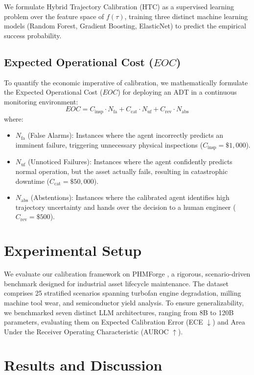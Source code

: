 \documentclass[10pt,twocolumn,a4paper]{article}
\begin{document}
We formulate Hybrid Trajectory Calibration (HTC) as a supervised learning problem over the feature space of $f(\tau)$, training three distinct machine learning models (Random Forest, Gradient Boosting, ElasticNet) to predict the empirical success probability.

\subsection{Expected Operational Cost ($EOC$)}
To quantify the economic imperative of calibration, we mathematically formulate the Expected Operational Cost ($EOC$) for deploying an ADT in a continuous monitoring environment:
\begin{equation}
EOC = C_{\text{insp}} \cdot N_{\text{fa}} + C_{\text{cat}} \cdot N_{\text{uf}} + C_{\text{rev}} \cdot N_{\text{abs}}
\end{equation}
where:
\begin{itemize}
    \item $N_{\text{fa}}$ (False Alarms): Instances where the agent incorrectly predicts an imminent failure, triggering unnecessary physical inspections ($C_{\text{insp}} = \$1,000$).
    \item $N_{\text{uf}}$ (Unnoticed Failures): Instances where the agent confidently predicts normal operation, but the asset actually fails, resulting in catastrophic downtime ($C_{\text{cat}} = \$50,000$).
    \item $N_{\text{abs}}$ (Abstentions): Instances where the calibrated agent identifies high trajectory uncertainty and hands over the decision to a human engineer ($C_{\text{rev}} = \$500$).
\end{itemize}

\section{Experimental Setup}
We evaluate our calibration framework on PHMForge \cite{feng2026phmforge}, a rigorous, scenario-driven benchmark designed for industrial asset lifecycle maintenance. The dataset comprises 25 stratified scenarios spanning turbofan engine degradation, milling machine tool wear, and semiconductor yield analysis. To ensure generalizability, we benchmarked seven distinct LLM architectures, ranging from 8B to 120B parameters, evaluating them on Expected Calibration Error (ECE $\downarrow$) and Area Under the Receiver Operating Characteristic (AUROC $\uparrow$).

\section{Results and Discussion}
\end{document}
